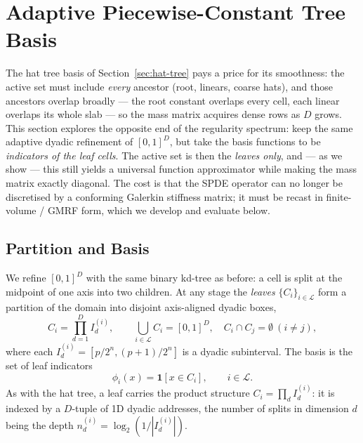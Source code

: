 \documentclass[11pt]{article}
\begin{document}
\section{Adaptive Piecewise-Constant Tree Basis}
\label{sec:const-tree}

The hat tree basis of Section~\ref{sec:hat-tree} pays a price for its smoothness:
the active set must include \emph{every} ancestor (root, linears, coarse hats),
and those ancestors overlap broadly --- the root constant overlaps every cell,
each linear overlaps its whole slab --- so the mass matrix acquires dense rows as
$D$ grows.  This section explores the opposite end of the regularity spectrum:
keep the same adaptive dyadic refinement of $[0,1]^D$, but take the basis
functions to be \emph{indicators of the leaf cells}.  The active set is then the
\emph{leaves only}, and --- as we show --- this still yields a universal function
approximator while making the mass matrix exactly diagonal.  The cost is that the
SPDE operator can no longer be discretised by a conforming Galerkin stiffness
matrix; it must be recast in finite-volume / GMRF form, which we develop and
evaluate below.

\subsection{Partition and Basis}
\label{sec:const-partition}

We refine $[0,1]^D$ with the same binary kd-tree as before: a cell is split at
the midpoint of one axis into two children.  At any stage the \emph{leaves}
$\{C_i\}_{i\in\mathcal{L}}$ form a partition of the domain into disjoint
axis-aligned dyadic boxes,
\begin{equation}
  C_i = \prod_{d=1}^D I_d^{(i)},
  \qquad
  \bigcup_{i\in\mathcal{L}} C_i = [0,1]^D,
  \quad
  C_i \cap C_j = \emptyset \ (i\ne j),
  \label{eq:const-partition}
\end{equation}
where each $I_d^{(i)}=[p/2^{n},(p+1)/2^n]$ is a dyadic subinterval.  The basis is
the set of leaf indicators
\begin{equation}
  \phi_i(x) = \mathbf{1}[x\in C_i],
  \qquad i\in\mathcal{L}.
  \label{eq:const-basis}
\end{equation}
As with the hat tree, a leaf carries the product structure
$C_i=\prod_d I_d^{(i)}$: it is indexed by a $D$-tuple of 1D dyadic addresses, the
number of splits in dimension $d$ being the depth $n_d^{(i)}=\log_2(1/|I_d^{(i)}|)$.
\end{document}
